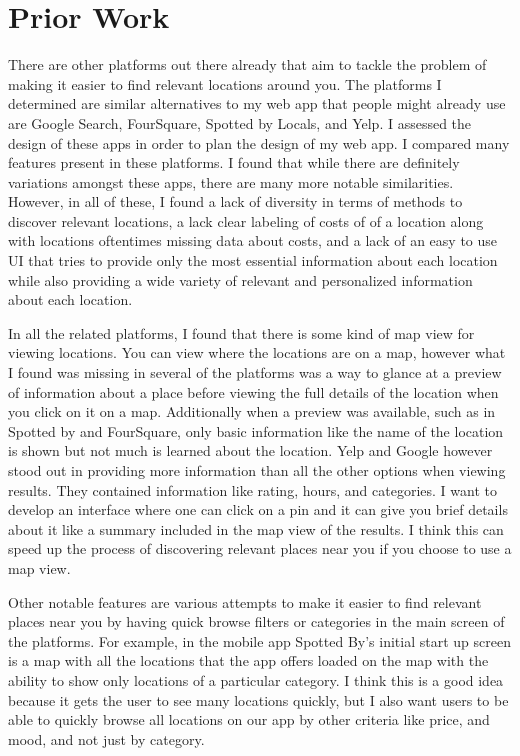 \documentclass[12pt,twocolumn]{article}
\begin{document}
\section{Prior Work}
There are other platforms out there already that aim to tackle the problem of making it easier to find  relevant locations around you. The  platforms I determined are similar alternatives to my web app that people might already use  are Google Search, FourSquare, Spotted by Locals, and Yelp. I assessed the design of these apps in order to plan the design of my web app. I compared many features present in these platforms. I found that while there are definitely variations amongst these apps, there are many more notable similarities. However, in all of these, I found a lack of diversity in terms of methods to discover relevant locations, a lack clear labeling of costs of of a location along with locations oftentimes missing data about costs, and a lack of an easy to use UI that tries to provide only the most essential information about each location while also providing a wide variety of relevant and personalized information about each location.


In all the related platforms, I found that there is some kind of map view for viewing locations. You can view where the locations are on a map, however what I found was missing in several of the platforms was a way to glance at a preview of information about a place before viewing the full details of the location when you click on it on a map. Additionally when a preview was available, such as in Spotted by and FourSquare, only basic information like the name of the location is shown but not much is learned about the location. Yelp and Google however stood out in providing more information than all the other options when viewing results. They contained information like rating, hours, and categories. I want to develop an interface where one can click on a pin and it can give you brief details about it like a summary included in the map view of the results. I think this can speed up the process of discovering relevant places near you if you choose to use a map view.

Other notable features are various attempts to make it easier to find relevant places near you by having quick browse filters or categories in the main screen of the platforms. For example, in the mobile app Spotted By’s initial start up screen is a map with all the locations that the app offers loaded on the map with the ability to show only locations of a particular category. I think this is a good idea because it gets the user to see many locations quickly,  but I also want users to be able to quickly browse all locations on our app by other criteria like price, and mood, and not just by category.  
\end{document}
